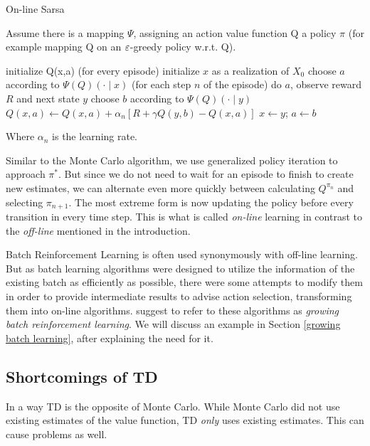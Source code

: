 \begin{algorithm}
	\caption{On-line Sarsa \parencite{suttonReinforcementLearningIntroduction1998}}
	Assume there is a mapping \(\Psi\), assigning an action value function Q a policy \(\pi\) (for example mapping Q on an \(\varepsilon\)-greedy policy w.r.t. Q).
	\begin{algorithmic}[1]
		\State initialize Q(x,a)
		 (for every episode)
			\State initialize \(x\) as a realization of \(X_0\)
			\State choose \(a\) according to \(\Psi(Q)(\cdot \mid x)\)
			\Repeat(for each step \(n\) of the episode)
				\State do \(a\), observe reward \(R\) and next state \(y\)
				\State choose \(b\) according to \(\Psi(Q)(\cdot \mid y)\)
				\State \(Q(x,a)\gets Q(x,a) + \alpha_n [R+\gamma Q(y,b) -Q(x,a) ]\)
				\State \(x\gets y\); \(a\gets b \)
		\EndWhile
	\end{algorithmic}
	Where \(\alpha_n\) is the learning rate.
\end{algorithm}

Similar to the Monte Carlo algorithm, we use generalized policy iteration to approach \(\pi^*\). But since we do not need to wait for an episode to finish to create new estimates, we can alternate even more quickly between calculating \(Q^{\pi_n}\) and selecting \(\pi_{n+1}\). The most extreme form is now updating the policy before every transition in every time step. This is what is called \emph{on-line} learning in contrast to the \emph{off-line} mentioned in the introduction. 

Batch Reinforcement Learning is often used synonymously with off-line learning. But as batch learning algorithms were designed to utilize the information of the existing batch as efficiently as possible, there were some attempts to modify them in order to provide intermediate results to advise action selection, transforming them into on-line algorithms. \textcite{langeBatchReinforcementLearning2012} suggest to refer to these algorithms as \emph{growing batch reinforcement learning}. We will discuss an example in Section \ref{growing batch learning}, after explaining the need for it. 

\subsection{Shortcomings of TD} \label{shortcomings TD}
In a way TD is the opposite of Monte Carlo. While Monte Carlo did not use existing estimates of the value function, TD \emph{only} uses existing estimates. This can cause problems as well.

